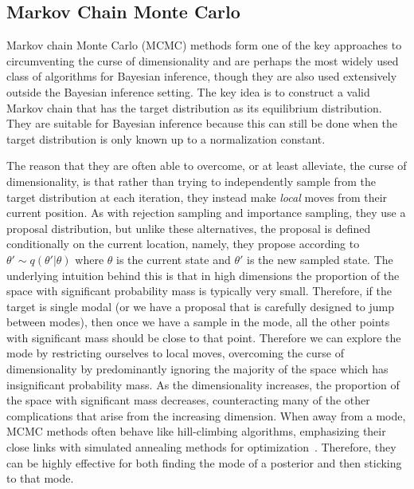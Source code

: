 
\subsection{Markov Chain Monte Carlo}
\label{sec:inf:foundation:mcmc}

Markov chain Monte Carlo (MCMC) methods \citep{metropolis1953equation,hastings1970monte,gilks1995markov} 
form one of the key approaches to circumventing the curse of dimensionality
and are perhaps the most widely used class of algorithms for Bayesian inference, though they
are also used extensively outside the Bayesian inference setting.  The key idea is to construct
a valid Markov chain that has the target distribution as its equilibrium distribution.  They are suitable
for Bayesian inference because this can still be done when the target distribution is only known
up to a normalization constant.  

The reason that they are often able to overcome, or at least alleviate,
the curse of dimensionality, is that rather than trying to independently sample from the target distribution
at each iteration, they instead make \emph{local} moves from their current position.  As with
rejection sampling and importance sampling, they use a proposal distribution, but unlike these
alternatives, the proposal is defined conditionally on the current location, namely, they propose
according to $\theta' \sim q(\theta' | \theta)$ where $\theta$ is the current state and $\theta'$ is the new
sampled state.  The underlying intuition behind this is that in high dimensions the proportion of the
space with significant probability mass is typically very small.  Therefore, if the target is single modal (or
we have a proposal that is carefully designed to jump between modes), then once we have a sample
in the mode, all the other points with significant mass should be close to that point.  Therefore we can
explore the mode by restricting ourselves to local moves, overcoming the curse of dimensionality by
predominantly ignoring the majority of the space which has insignificant probability mass.  As the
dimensionality increases, the proportion of the space with significant mass decreases, counteracting
many of the other complications that arise from the increasing dimension.  When away from a mode,
MCMC methods often behave like hill-climbing algorithms, emphasizing their close links with simulated annealing
methods for optimization~\citep{aarts1988simulated}.  Therefore, they can be highly effective for both finding the mode
of a posterior and then sticking to that mode.

